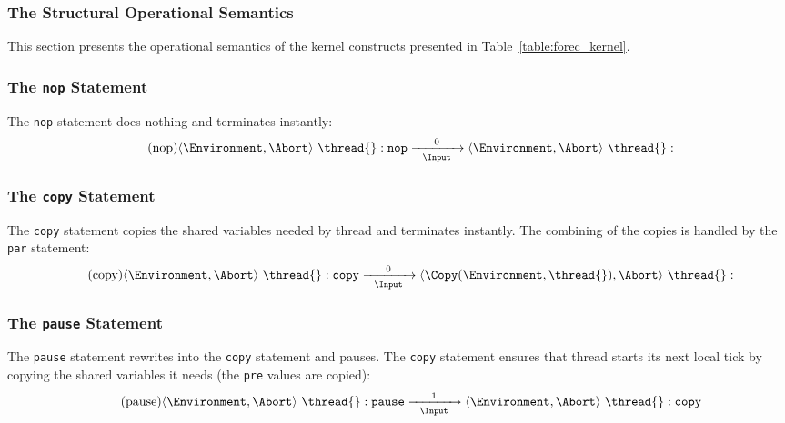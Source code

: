 \clearpage


\subsubsection{The Structural Operational Semantics}
\label{sec:forec_semantics:sos}
This section presents the operational semantics of the kernel
constructs presented in Table~\ref{table:forec_kernel}.

\subsubsection{The \texttt{nop} Statement}
The \verb$nop$ statement does nothing and terminates instantly:
\begin{equation*}
	\tag{nop}
	\label{forec:nop}
	\langle \Environment, \Abort \rangle ~ \thread{}:\mathtt{nop}
		\xrightarrow[~~\Input~~]{0} 
	\langle \Environment, \Abort \rangle ~ \thread{}:
\end{equation*}

\subsubsection{The \texttt{copy} Statement}
The \verb$copy$ statement copies the shared variables needed
by thread \thread{} and terminates instantly. The combining of 
the copies is handled by the \verb$par$ statement:
\begin{equation*}
	\tag{copy}
	\label{forec:copy}
	\langle \Environment, \Abort \rangle ~ \thread{}:\mathtt{copy}
		\xrightarrow[~~\Input~~]{0} 
	\langle \Copy(\Environment, \thread{}), \Abort \rangle ~ \thread{}:
\end{equation*}

\subsubsection{The \texttt{pause} Statement}
The \verb$pause$ statement rewrites into the \verb$copy$ statement
and pauses. The \verb$copy$ statement ensures that thread \thread{} 
starts its next local tick by copying the shared variables it needs
(the \verb$pre$ values are copied):
\begin{equation*}
	\tag{pause}
	\label{forec:pause}
	\langle \Environment, \Abort \rangle ~ \thread{}:\mathtt{pause}
		\xrightarrow[~~\Input~~]{1} 
	\langle \Environment, \Abort \rangle ~ \thread{}:\mathtt{copy}
\end{equation*}

